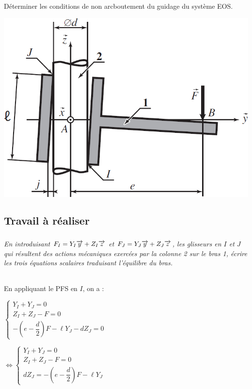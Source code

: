 \documentclass[10pt,fleqn]{article} %
\begin{document}
\begin{multicols}{2}
\begin{obj}
Déterminer les conditions de non arcboutement du guidage du système EOS. 
\end{obj}

\begin{center}
\includegraphics[width=\linewidth]{images/fig_01}
\end{center}

\subsection*{Travail à réaliser}
\subparagraph{}\textit{En introduisant $F_I = Y_ I \overrightarrow{y} + Z_ I \overrightarrow{z}$ et $F_J = Y_ J \overrightarrow{y} + Z_ J \overrightarrow{z}$, les glisseurs en $I$ et $J$ qui résultent des actions mécaniques exercées par la colonne 2 sur le bras 1, écrire les trois équations scalaires traduisant l’équilibre du bras.}
\ifprof
\begin{corrige}~\\

En appliquant le PFS en $I$, on a : 

$\left\{
\begin{array}{l}
Y_I + Y_J = 0 \\
Z_I + Z_J -F = 0 \\ 
-\left(e-\dfrac{d}{2}\right)F -\ell Y_J -d Z_J = 0
\end{array}
\right.$

$
\Leftrightarrow
\left\{
\begin{array}{l}
Y_I + Y_J = 0 \\
Z_I + Z_J -F = 0 \\ 
d Z_J = -\left(e-\dfrac{d}{2}\right)F -\ell Y_J 
\end{array}
\right.$
\end{corrige}
\else
\fi



\end{multicols}
\end{document}
